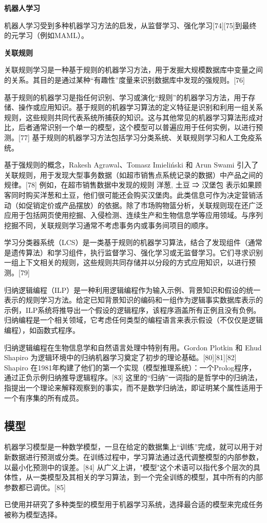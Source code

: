 \textbf{机器人学习}

机器人学习受到多种机器学习方法的启发，从监督学习、强化学习[74][75]到最终的元学习（例如MAML）。

\textbf{关联规则}

关联规则学习是一种基于规则的机器学习方法，用于发掘大规模数据库中变量之间的关系。其目的是通过某种“有趣性”度量来识别数据库中发现的强规则。[76]

基于规则的机器学习是指任何识别、学习或演化“规则”的机器学习方法，用于存储、操作或应用知识。基于规则的机器学习算法的定义特征是识别和利用一组关系规则，这些规则共同代表系统所捕获的知识。这与其他常见的机器学习算法形成对比，后者通常识别一个单一的模型，这个模型可以普遍应用于任何实例，以进行预测。[77] 基于规则的机器学习方法包括学习分类系统、关联规则学习和人工免疫系统。

基于强规则的概念，Rakesh Agrawal、Tomasz Imieliński 和 Arun Swami 引入了关联规则，用于发现大型事务数据（如超市销售点系统记录的数据）中产品之间的规律。[78] 例如，在超市销售数据中发现的规则 
{
洋葱,
土豆
}
⇒
{
汉堡包
}  
表示如果顾客同时购买洋葱和土豆，他们很可能还会购买汉堡肉。此类信息可作为决定营销活动（如促销定价或产品摆放）的依据。除了市场购物篮分析，关联规则现在还广泛应用于包括网页使用挖掘、入侵检测、连续生产和生物信息学等应用领域。与序列挖掘不同，关联规则学习通常不考虑事务内或事务间项目的顺序。

学习分类器系统（LCS）是一类基于规则的机器学习算法，结合了发现组件（通常是遗传算法）和学习组件，执行监督学习、强化学习或无监督学习。它们寻求识别一组上下文相关的规则，这些规则共同存储并以分段的方式应用知识，以进行预测。[79]

归纳逻辑编程（ILP）是一种利用逻辑编程作为输入示例、背景知识和假设的统一表示的规则学习方法。给定已知背景知识的编码和一组作为逻辑事实数据库表示的示例，ILP系统将推导出一个假设的逻辑程序，该程序涵盖所有正例且没有负例。归纳编程是一个相关领域，它考虑任何类型的编程语言来表示假设（不仅仅是逻辑编程），如函数式程序。

归纳逻辑编程在生物信息学和自然语言处理中特别有用。Gordon Plotkin 和 Ehud Shapiro 为逻辑环境中的归纳机器学习奠定了初步的理论基础。[80][81][82] Shapiro 在1981年构建了他们的第一个实现（模型推理系统）：一个Prolog程序，通过正负示例归纳推导逻辑程序。[83] 这里的“归纳”一词指的是哲学中的归纳法，指提出一个理论来解释观察到的事实，而不是数学归纳法，即证明某个属性适用于一个有序集的所有成员。
\subsection{模型}
机器学习模型是一种数学模型，一旦在给定的数据集上“训练”完成，就可以用于对新数据进行预测或分类。在训练过程中，学习算法通过迭代调整模型的内部参数，以最小化预测中的误差。[84] 从广义上讲，"模型"这个术语可以指代多个层次的具体性，从一类模型及其相关的学习算法，到一个完全训练的模型，其中所有的内部参数都已调优。[85]

已使用并研究了多种类型的模型用于机器学习系统，选择最合适的模型来完成任务被称为模型选择。
